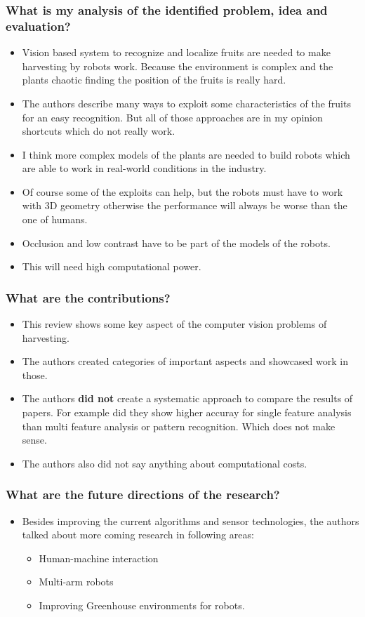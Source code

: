 \documentclass{article}
\begin{document}
\subsubsection*{What is my analysis of the identified problem, idea and evaluation?}
\begin{itemize}
    \item Vision based system to recognize and localize fruits are needed to make harvesting by robots work. Because the environment is complex and the plants chaotic finding the position of the fruits is really hard.
    \item The authors describe many ways to exploit some characteristics of the fruits for an easy recognition. But all of those approaches are in my opinion shortcuts which do not really work.
    \item I think more complex models of the plants are needed to build robots which are able to work in real-world conditions in the industry.
    \item Of course some of the exploits can help, but the robots must have to work with 3D geometry otherwise the performance will always be worse than the one of humans. 
    \item Occlusion and low contrast have to be part of the models of the robots.
    \item This will need high computational power.
\end{itemize}
\subsubsection*{What are the contributions?}
\begin{itemize}
    \item This review shows some key aspect of the computer vision problems of harvesting. 
    \item The authors created categories of important aspects and showcased work in those.
    \item The authors \textbf{did not} create a systematic approach to compare the results of papers. For example did they show higher accuray for single feature analysis than multi feature analysis or pattern recognition. Which does not make sense.
    \item The authors also did not say anything about computational costs.
\end{itemize}
\subsubsection*{What are the future directions of the research?}
\begin{itemize}
    \item Besides improving the current algorithms and sensor technologies, the authors talked about more coming research in following areas: \begin{itemize}
        \item Human-machine interaction
        \item Multi-arm robots
        \item Improving Greenhouse environments for robots.
    \end{itemize}
\end{itemize}
\end{document}
